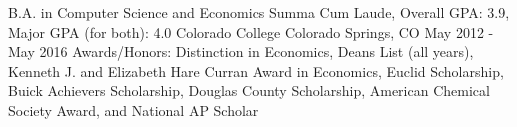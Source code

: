 


\begin{cventries}


\cventry
{B.A. in Computer Science and Economics Summa Cum Laude, Overall GPA: 3.9, Major GPA (for both): 4.0} %
{Colorado College} %
{Colorado Springs, CO} %
{May 2012 - May 2016} %
{Awards/Honors: Distinction in Economics, Deans List (all years), Kenneth J. and Elizabeth Hare Curran Award in Economics, Euclid Scholarship, Buick Achievers Scholarship, Douglas County Scholarship, American Chemical Society Award, and National AP Scholar}


\end{cventries}
